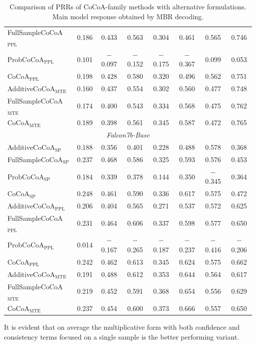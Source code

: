 \documentclass[11pt]{article}
\begin{document}
\begin{table}[htbp]
{\begin{tabular}{l ccccccc}
FullSampleCoCoA$_{\mathrm{PPL}}$ & 0.186 & 0.433 & 0.563 & 0.304 & 0.461 & 0.565 & 0.746 \\
ProbCoCoA$_{\mathrm{PPL}}$ & 0.101 & $-$0.097 & $-$0.152 & $-$0.175 & $-$0.367 & 0.099 & 0.053 \\
CoCoA$_{\mathrm{PPL}}$ & 0.198 & 0.428 & 0.580 & 0.320 & 0.496 & 0.562 & 0.751 \\
AdditiveCoCoA$_{\mathrm{MTE}}$ & 0.160 & 0.437 & 0.554 & 0.302 & 0.560 & 0.477 & 0.748 \\
FullSampleCoCoA$_{\mathrm{MTE}}$ & 0.174 & 0.400 & 0.543 & 0.334 & 0.568 & 0.475 & 0.762 \\
CoCoA$_{\mathrm{MTE}}$ & 0.189 & 0.398 & 0.561 & 0.345 & 0.587 & 0.472 & 0.765 \\
\midrule
\multicolumn{8}{c}{\textit{Falcon7b-Base}} \\
\midrule
AdditiveCoCoA$_{\mathrm{SP}}$ & 0.188 & 0.356 & 0.401 & 0.228 & 0.488 & 0.578 & 0.368 \\
FullSampleCoCoA$_{\mathrm{SP}}$ & 0.237 & 0.468 & 0.586 & 0.325 & 0.593 & 0.576 & 0.453 \\
ProbCoCoA$_{\mathrm{SP}}$ & 0.184 & 0.339 & 0.378 & 0.144 & 0.350 & $-$0.345 & 0.364 \\
CoCoA$_{\mathrm{SP}}$ & 0.248 & 0.461 & 0.590 & 0.336 & 0.617 & 0.575 & 0.472 \\
AdditiveCoCoA$_{\mathrm{PPL}}$ & 0.206 & 0.404 & 0.565 & 0.271 & 0.537 & 0.572 & 0.625 \\
FullSampleCoCoA$_{\mathrm{PPL}}$ & 0.231 & 0.464 & 0.606 & 0.337 & 0.598 & 0.577 & 0.650 \\
ProbCoCoA$_{\mathrm{PPL}}$ & 0.014 & $-$0.167 & $-$0.265 & $-$0.187 & $-$0.237 & $-$0.416 & $-$0.206 \\
CoCoA$_{\mathrm{PPL}}$ & 0.242 & 0.462 & 0.613 & 0.345 & 0.624 & 0.575 & 0.662 \\
AdditiveCoCoA$_{\mathrm{MTE}}$ & 0.191 & 0.488 & 0.612 & 0.353 & 0.644 & 0.564 & 0.617 \\
FullSampleCoCoA$_{\mathrm{MTE}}$ & 0.219 & 0.452 & 0.591 & 0.368 & 0.654 & 0.556 & 0.629 \\
CoCoA$_{\mathrm{MTE}}$ & 0.237 & 0.454 & 0.600 & 0.373 & 0.666 & 0.557 & 0.650 \\
\bottomrule
\end{tabular}%
}
\caption{Comparison of PRRs of CoCoA-family methods with alternative formulations. Main model response obtained by MBR decoding.}
\label{tab:cocoa_table10}
\end{table}
It is evident that on average the multiplicative form with both confidence and consistency terms focused on a single sample is the better performing variant.
\end{document}
